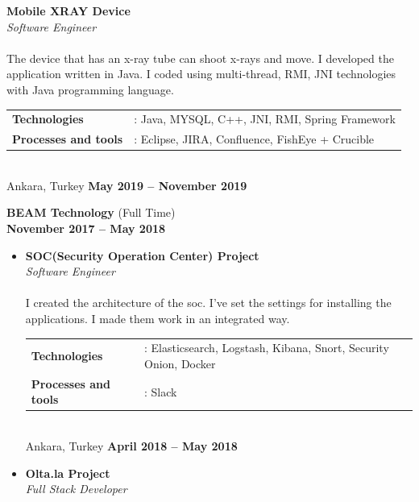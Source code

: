 \documentclass[margin]{res}
\begin{document}
\begin{resume}
\begin{itemize}
    \textbf {Mobile XRAY Device} \\
    \textit{Software Engineer} \\
    \\ 
    The device that has an x-ray tube can shoot x-rays and move. I developed the application written in Java. I coded using multi-thread, RMI, JNI technologies with Java programming language.    \\
    \begin{tabular}{@{} l l}
        \textbf{Technologies} & : Java, MYSQL, C++, JNI, RMI, Spring Framework \\ 
        \textbf{Processes and tools} & :  Eclipse, JIRA, Confluence, FishEye + Crucible \\
    \end{tabular}
    \\
    Ankara, Turkey
    \hfill {\bf May 2019 – November 2019 }\\[0.08in] \newline
\end{itemize}
\textbf{BEAM Technology} (Full Time) \\ {\bf November 2017 – May 2018 }\\
\begin{itemize}
    \item 
    \textbf {SOC(Security Operation Center) Project} \\
    \textit{Software Engineer} \\
    \\
    I created the architecture of the soc. I've set the settings for installing the applications. I made them work in an integrated way.    \\
    \begin{tabular}{@{} l l}
        \textbf{Technologies} & :   Elasticsearch, Logstash, Kibana, Snort, Security Onion, Docker \\ 
        \textbf{Processes and tools} & :  Slack \\
    \end{tabular}
    \\
    Ankara, Turkey
    \hfill {\bf April 2018 – May 2018 }\\[0.08in] \newline
\end{itemize}
\begin{itemize}
    \item 
    \textbf {Olta.la Project} \\
    \textit{Full Stack Developer} \\

\end{itemize}
\end{resume}
\end{document}
